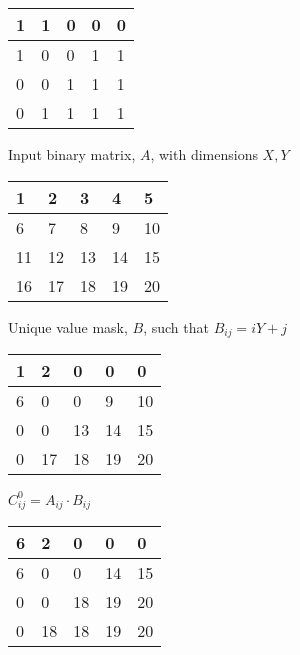 \documentclass[../main.tex]{subfiles}
\begin{document}
    \begin{figure}[h]
      \centering
      \begin{subfigure}[b]{0.45\textwidth}
        \centering
        \begin{tabular}{|p{1em}|p{1em}|p{1em}|p{1em}|p{1em}|}
          \hline
          1&1&0&0&0\\ \hline
          1&0&0&1&1\\ \hline
          0&0&1&1&1\\ \hline
          0&1&1&1&1\\  \hline
        \end{tabular}
        \caption{Input binary matrix, $A$, with dimensions $X,Y$}
      \end{subfigure}
      \begin{subfigure}[b]{0.45\textwidth}
        \centering
        \begin{tabular}{|p{1em}|p{1em}|p{1em}|p{1em}|p{1em}|}
          \hline
          1&2&3&4&5\\ \hline
          6&7&8&9&10\\ \hline
          11&12&13&14&15\\ \hline
          16&17&18&19&20\\  \hline
        \end{tabular}
        \caption{Unique value mask, $B$, such that $B_{ij}=iY+j$}
      \end{subfigure}
      \begin{subfigure}[b]{0.45\textwidth}
        \centering
        \begin{tabular}{|p{1em}|p{1em}|p{1em}|p{1em}|p{1em}|}
          \hline
          1&2&0&0&0\\ \hline
          6&0&0&9&10\\ \hline
          0&0&13&14&15\\ \hline
          0&17&18&19&20\\  \hline
        \end{tabular}
        \caption{ $C^0_{ij}=A_{ij}\cdot B_{ij}$}
      \end{subfigure}
      \begin{subfigure}[b]{0.45\textwidth}
        \centering
        \begin{tabular}{|p{1em}|p{1em}|p{1em}|p{1em}|p{1em}|}
          \hline
          6&2&0&0&0\\ \hline
          6&0&0&14&15\\ \hline
          0&0&18&19&20\\ \hline
          0&18&18&19&20\\  \hline

\end{tabular}
\end{subfigure}
\end{figure}
\end{document}
